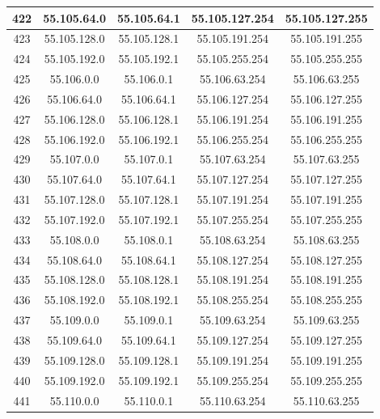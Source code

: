 \documentclass[letterpaper,12pt]{article}
\begin{document}
\begin{center}
\begin{longtable}{|c|c|c|c|c|}
                422 & 55.105.64.0 & 55.105.64.1 & 55.105.127.254 & 55.105.127.255 \\ \hline
                423 & 55.105.128.0 & 55.105.128.1 & 55.105.191.254 & 55.105.191.255 \\ \hline
                424 & 55.105.192.0 & 55.105.192.1 & 55.105.255.254 & 55.105.255.255 \\ \hline
                425 & 55.106.0.0 & 55.106.0.1 & 55.106.63.254 & 55.106.63.255 \\ \hline
                426 & 55.106.64.0 & 55.106.64.1 & 55.106.127.254 & 55.106.127.255 \\ \hline
                427 & 55.106.128.0 & 55.106.128.1 & 55.106.191.254 & 55.106.191.255 \\ \hline
                428 & 55.106.192.0 & 55.106.192.1 & 55.106.255.254 & 55.106.255.255 \\ \hline
                429 & 55.107.0.0 & 55.107.0.1 & 55.107.63.254 & 55.107.63.255 \\ \hline
                430 & 55.107.64.0 & 55.107.64.1 & 55.107.127.254 & 55.107.127.255 \\ \hline
                431 & 55.107.128.0 & 55.107.128.1 & 55.107.191.254 & 55.107.191.255 \\ \hline
                432 & 55.107.192.0 & 55.107.192.1 & 55.107.255.254 & 55.107.255.255 \\ \hline
                433 & 55.108.0.0 & 55.108.0.1 & 55.108.63.254 & 55.108.63.255 \\ \hline
                434 & 55.108.64.0 & 55.108.64.1 & 55.108.127.254 & 55.108.127.255 \\ \hline
                435 & 55.108.128.0 & 55.108.128.1 & 55.108.191.254 & 55.108.191.255 \\ \hline
                436 & 55.108.192.0 & 55.108.192.1 & 55.108.255.254 & 55.108.255.255 \\ \hline
                437 & 55.109.0.0 & 55.109.0.1 & 55.109.63.254 & 55.109.63.255 \\ \hline
                438 & 55.109.64.0 & 55.109.64.1 & 55.109.127.254 & 55.109.127.255 \\ \hline
                439 & 55.109.128.0 & 55.109.128.1 & 55.109.191.254 & 55.109.191.255 \\ \hline
                440 & 55.109.192.0 & 55.109.192.1 & 55.109.255.254 & 55.109.255.255 \\ \hline
                441 & 55.110.0.0 & 55.110.0.1 & 55.110.63.254 & 55.110.63.255 \\ \hline

\end{longtable}
\end{center}
\end{document}
